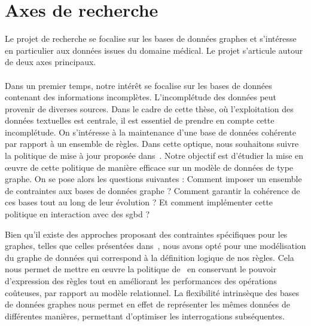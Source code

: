 \section{Axes de recherche}

Le projet de recherche se focalise sur les bases de données graphes et s'intéresse en particulier aux données issues du domaine médical.
Le projet s'articule autour de deux axes principaux.

\paragraph{}
Dans un premier temps, notre intérêt se focalise sur les bases de données contenant des informations incomplètes.
L'incomplétude des données peut provenir de diverses sources.
Dans le cadre de cette thèse, où l'exploitation des données textuelles est centrale, il est essentiel de prendre en compte cette incomplétude.
On s'intéresse à la maintenance d'une base de données cohérente par rapport à un ensemble de règles.
Dans cette optique, nous souhaitons suivre la politique de mise à jour proposée dans~\cite{chabinConsistentUpdatingDatabases2020}.
Notre objectif est d'étudier la mise en œuvre de cette politique de manière efficace sur un modèle de données de type graphe.
On se pose alors les questions suivantes : Comment imposer un ensemble de contraintes aux bases de données graphe ? Comment garantir la cohérence de ces bases tout au long de leur évolution ? Et comment implémenter cette politique en interaction avec des \gls{sgbd} ?

Bien qu'il existe des approches proposant des contraintes spécifiques pour les graphes, telles que celles présentées dans~\cite{fanDependenciesGraphs2019}, nous avons opté pour une modélisation du graphe de données qui correspond à la définition logique de nos règles.
Cela nous permet de mettre en œuvre la politique de~\cite{chabinConsistentUpdatingDatabases2020} en conservant le pouvoir d'expression des règles tout en améliorant les performances des opérations coûteuses, par rapport au modèle relationnel.
La flexibilité intrinsèque des bases de données graphes nous permet en effet de représenter les mêmes données de différentes manières, permettant d'optimiser les interrogations subséquentes.

